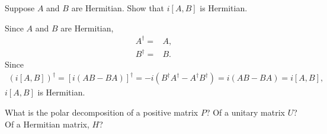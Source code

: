 \documentclass[en]{sol-man}
\begin{document}
\begin{exe}
    Suppose $A$ and $B$ are Hermitian. Show that $i[A,B]$ is Hermitian.
\end{exe}
\begin{pf}
    Since $A$ and $B$ are Hermitian,
    \begin{align}
        A^{\dagger}=&A,\\
        B^{\dagger}=&B.
    \end{align}
    Since
    \begin{align}
        (i[A,B])^{\dagger}=[i(AB-BA)]^{\dagger}=-i(B^{\dagger}A^{\dagger}-A^{\dagger}B^{\dagger})=i(AB-BA)=i[A,B],
    \end{align}
    $i[A,B]$ is Hermitian.
\end{pf}

\begin{exe}
    What is the polar decomposition of a positive matrix $P$? Of a unitary matrix $U$? Of a Hermitian matrix, $H$?
\end{exe}
\end{document}
